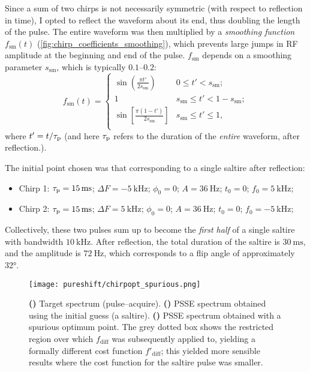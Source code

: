 Since a sum of two chirps is not necessarily symmetric (with respect to reflection in time), I opted to reflect the waveform about its end, thus doubling the length of the pulse.
The entire waveform was then multiplied by a \textit{smoothing function} $f_\text{sm}(t)$ (\cref{fig:chirp_coefficients_smoothing}), which prevents large jumps in RF amplitude at the beginning and end of the pulse.
$f_\text{sm}$ depends on a smoothing parameter $s_\text{sm}$, which is typically $0.1$--$0.2$:
\begin{equation}
    \label{eq:sming_function}
    f_\text{sm}(t) = \begin{cases}
        \displaystyle \sin\left(\frac{\pi t'}{2 s_\text{sm}}\right) & 0 \leq t' < s_\text{sm}; \\
        \displaystyle 1 & s_\text{sm} \leq t' < 1 - s_\text{sm}; \\
        \displaystyle \sin\left[\frac{\pi (1 - t')}{2 s_\text{sm}}\right] & s_\text{sm} \leq t' \leq 1, \\
    \end{cases}
\end{equation}
where $t' = t/\tau_\mathrm{p}$ (and here $\tau_\mathrm{p}$ refers to the duration of the \textit{entire} waveform, after reflection.).

The initial point chosen was that corresponding to a single saltire after reflection:
\begin{itemize}
    \item Chirp 1: $\taup = \SI{15}{\ms}$; $\Delta F = \SI{-5}{\kHz}$; $\phi_0 = 0$; $A = \SI{36}{\Hz}$; $t_0 = 0$; $f_0 = \SI{5}{\kHz}$;
    \item Chirp 2: $\taup = \SI{15}{\ms}$; $\Delta F = \SI{5}{\kHz}$; $\phi_0 = 0$; $A = \SI{36}{\Hz}$; $t_0 = 0$; $f_0 = \SI{-5}{\kHz}$;
\end{itemize}
Collectively, these two pulses sum up to become the \textit{first half} of a single saltire with bandwidth $\SI{10}{\kHz}$.
After reflection, the total duration of the saltire is $\SI{30}{\ms}$, and the amplitude is $\SI{72}{\Hz}$, which corresponds to a flip angle of approximately \ang{32}.

\begin{figure}[htbp]
    \centering
    \texttt{[image: pureshift/chirpopt\_spurious.png]}
    {\label{fig:chirpopt_spurious_target}}
    {\label{fig:chirpopt_spurious_saltire}}
    {\label{fig:chirpopt_spurious_badoptimum}}
    \caption[Spurious optimum obtained in waveform optimisation using $f_\text{diff}$]{
        \textbf{()} Target spectrum (pulse--acquire).
        \textbf{()} PSSE spectrum obtained using the initial guess (a saltire).
        \textbf{()} PSSE spectrum obtained with a spurious optimum point.
        The grey dotted box shows the restricted region over which $f_\text{diff}$ was subsequently applied to, yielding a formally different cost function $f'_\text{diff}$; this yielded more sensible results where the cost function for the saltire pulse was smaller.
    }
    \label{fig:chirpopt_spurious}
\end{figure}


